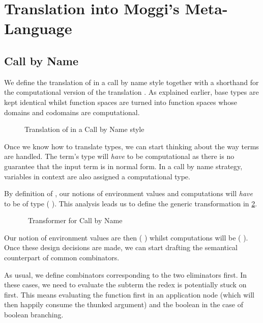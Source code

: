 \section{Translation into Moggi's Meta-Language}

\subsection{Call by Name}

We define the translation  of  in a call by name style together
with a shorthand for the computational version of the translation . As
explained earlier, base types are kept identical whilst function spaces are turned
into function spaces whose domains and codomains are computational.

\begin{figure}[h]
\caption{Translation of  in a Call by Name style\label{fig:moggicbn}}
\end{figure}

Once we know how to translate types, we can start thinking about the way terms are
handled. The term's type will \emph{have} to be computational as there is no guarantee
that the input term is in normal form. In a call by name strategy, variables in context
are also assigned a computational type.

By definition of , our notions of environment values and computations
will \emph{have} to be of type ( ). This analysis leads us to
define the generic transformation  in \cref{fig:cbntransformer}.

\begin{figure}[h]
\caption{~Transformer for Call by Name\label{fig:cbntransformer}}
\end{figure}

Our notion of environment values are then ( )
whilst computations will be ( ). Once these
design decisions are made, we can start drafting the semantical counterpart of
common combinators.

As usual, we define combinators corresponding to the two eliminators first.
In these cases, we need to evaluate the subterm the redex is potentially
stuck on first. This means evaluating the function first in an application
node (which will then happily consume the thunked argument) and the boolean
in the case of boolean branching.

